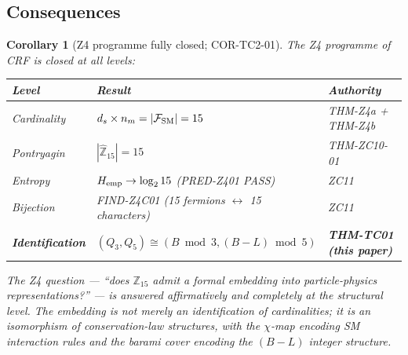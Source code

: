 \documentclass[12pt, a4paper]{article}
\newtheorem{corollary}{Corollary}[section]
\begin{document}
\subsection{Consequences}
\label{sec:consequences}

\begin{corollary}[Z4 programme fully closed; COR-TC2-01]
\label{cor:z4-closed}
The Z4 programme of CRF is closed at all levels:

\begin{center}
{\small
\renewcommand{\arraystretch}{1.30}
\begin{tabular}{p{3.5cm} p{5.5cm} p{2.5cm}}
\toprule
\textbf{Level} & \textbf{Result} & \textbf{Authority} \\
\midrule
Cardinality & $d_s \times n_m = |\mathcal{F}_{\rm SM}| = 15$
  & THM-Z4a + THM-Z4b \\
Pontryagin & $|\hat{\mathbb{Z}}_{15}| = 15$
  & THM-ZC10-01 \\
Entropy & $H_{\rm emp} \to \log_2 15$ (PRED-Z401 PASS)
  & ZC11 \\
Bijection & FIND-Z4C01 (15 fermions $\leftrightarrow$ 15 characters)
  & ZC11 \\
\textbf{Identification} & \textbf{$(Q_3,Q_5) \cong (B\bmod 3, (B-L)\bmod 5)$}
  & \textbf{THM-TC01 (this paper)} \\
\bottomrule
\end{tabular}
}
\end{center}

The Z4 question --- ``does $\mathbb{Z}_{15}$ admit a formal embedding
into particle-physics representations?'' --- is answered affirmatively
and completely at the structural level. The embedding is not merely
an identification of cardinalities; it is an isomorphism of
conservation-law structures, with the $\chi$-map encoding SM
interaction rules and the barami cover encoding the $(B-L)$ integer
structure.
\end{corollary}
\end{document}
